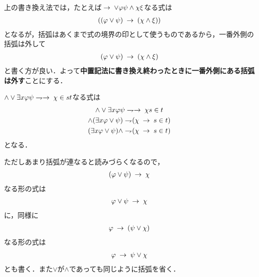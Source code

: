 	上の書き換え法では，たとえば$\hspace{0.25em}\rightarrow\hspace{0.25em} \vee \varphi \psi \wedge \chi \xi$なる式は
	\begin{align}
		((\varphi \vee \psi) \hspace{0.25em}\rightarrow\hspace{0.25em} (\chi \wedge \xi))
	\end{align}
	となるが，括弧はあくまで式の境界の印として使うものであるから，一番外側の括弧は外して
	\begin{align}
		(\varphi \vee \psi) \hspace{0.25em}\rightarrow\hspace{0.25em} (\chi \wedge \xi)
	\end{align}
	と書く方が良い．よって{\bf 中置記法に書き換え終わったときに一番外側にある括弧は外す}ことにする．
	
	$\wedge \vee \exists x \varphi \psi \negation \rarrow \chi \in s t$なる式は
	\begin{align}
		\begin{gathered}
			\wedge \vee \exists x \varphi \psi \negation \rarrow \chi s \in t \\
			\wedge (\exists x \varphi \vee \psi) \negation (\chi \rarrow s \in t) \\
			(\exists x \varphi \vee \psi) \wedge \negation (\chi \rarrow s \in t)
		\end{gathered}
	\end{align}
	となる．
	
	ただしあまり括弧が連なると読みづらくなるので，
	\begin{align}
		(\varphi \vee \psi) \hspace{0.25em}\rightarrow\hspace{0.25em} \chi
	\end{align}
	なる形の式は
	\begin{align}
		\varphi \vee \psi \hspace{0.25em}\rightarrow\hspace{0.25em} \chi
	\end{align}
	に，同様に
	\begin{align}
		\varphi \hspace{0.25em}\rightarrow\hspace{0.25em} (\psi \vee \chi)
	\end{align}
	なる形の式は
	\begin{align}
		\varphi \hspace{0.25em}\rightarrow\hspace{0.25em} \psi \vee \chi
	\end{align}
	とも書く．また$\vee$が$\wedge$であっても同じように括弧を省く．